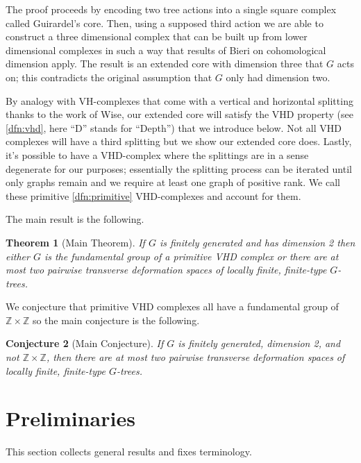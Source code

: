 \documentclass[12pt,parskip=full]{report}
\theoremstyle{plain}
\newtheorem{thm}{Theorem}[section]
\newtheorem{conj}[thm]{Conjecture}
\theoremstyle{definition}
\begin{document}
The proof proceeds by encoding two tree actions into a single square complex called Guirardel's core. Then, using a supposed third action we are able to construct a three dimensional complex that can be built up from lower dimensional complexes in such a way that results of Bieri on cohomological dimension apply. The result is an extended core with dimension three that \(G\) acts on; this contradicts the original assumption that \(G\) only had dimension two. 

By analogy with VH-complexes that come with a vertical and horizontal splitting thanks to the work of Wise, our extended core  will satisfy the VHD property (see \ref{dfn:vhd}, here ``D'' stands for ``Depth'') that we introduce below. Not all VHD complexes will have a third splitting but we show our extended core does. Lastly, it's possible to have a VHD-complex where the splittings are in a sense degenerate for our purposes; essentially the splitting process can be iterated until only graphs remain and we require at least one graph of positive rank. We call these primitive \ref{dfn:primitive} VHD-complexes and account for them.

The main result is the following.
\begin{thm}
    [Main Theorem]
    \label{thm:martino}
    If \(G\) is finitely generated and has dimension 2 then either \(G\) is the fundamental group of a primitive VHD complex or there are at most two pairwise transverse deformation spaces of locally finite, finite-type \(G\)-trees.
\end{thm}

% 

We conjecture that primitive VHD complexes all have a fundamental group of \(\mathbb{Z}\times \mathbb{Z}\) so the main conjecture is the following.

\begin{conj}
    [Main Conjecture]
    If \(G\) is finitely generated, dimension 2, and not \(\mathbb{Z}\times \mathbb{Z}\), then there are at most two pairwise transverse deformation spaces of locally finite, finite-type \(G\)-trees.
\end{conj}

\chapter{Preliminaries}

    This section collects general results and fixes terminology.

\end{document}

